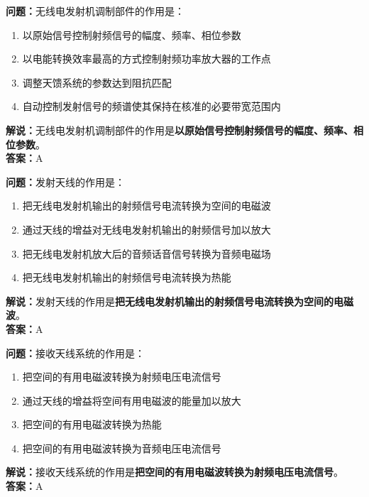 \textbf{问题：}无线电发射机调制部件的作用是：

\begin{enumerate}[label=\Alph*), leftmargin=1cm]
	\item 以原始信号控制射频信号的幅度、频率、相位参数
	\item 以电能转换效率最高的方式控制射频功率放大器的工作点
	\item 调整天馈系统的参数达到阻抗匹配
	\item 自动控制发射信号的频谱使其保持在核准的必要带宽范围内
\end{enumerate}

\textbf{解说：}无线电发射机调制部件的作用是\textbf{以原始信号控制射频信号的幅度、频率、相位参数}。\\\textbf{答案：}A%



\textbf{问题：}发射天线的作用是：

\begin{enumerate}[label=\Alph*), leftmargin=1cm]
	\item 把无线电发射机输出的射频信号电流转换为空间的电磁波
	\item 通过天线的增益对无线电发射机输出的射频信号加以放大
	\item 把无线电发射机放大后的音频话音信号转换为音频电磁场
	\item 把无线电发射机输出的射频信号电流转换为热能
\end{enumerate}

\textbf{解说：}发射天线的作用是\textbf{把无线电发射机输出的射频信号电流转换为空间的电磁波}。\\\textbf{答案：}A%



\textbf{问题：}接收天线系统的作用是：

\begin{enumerate}[label=\Alph*), leftmargin=1cm]
	\item 把空间的有用电磁波转换为射频电压电流信号
	\item 通过天线的增益将空间有用电磁波的能量加以放大
	\item 把空间的有用电磁波转换为热能
	\item 把空间的有用电磁波转换为音频电压电流信号
\end{enumerate}

\textbf{解说：}接收天线系统的作用是\textbf{把空间的有用电磁波转换为射频电压电流信号}。\\\textbf{答案：}A%




